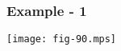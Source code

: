 \begin{frame}
\frametitle{Example - 1}

\begin{center}
\texttt{[image: fig-90.mps]}
\end{center}
\end{frame}
